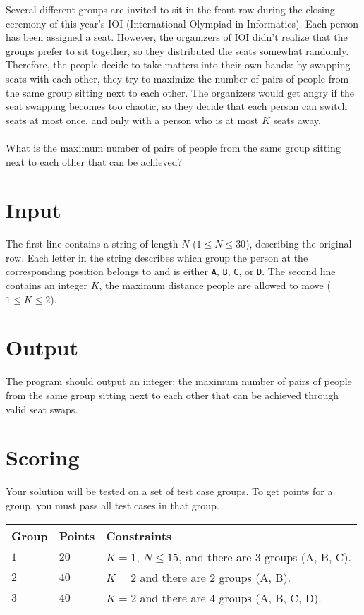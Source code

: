 
Several different groups are invited to sit in the front row during the closing ceremony of this year's IOI (International Olympiad in Informatics). Each person has been assigned a seat. However, the organizers of IOI didn't realize that the groups prefer to sit together, so they distributed the seats somewhat randomly. Therefore, the people decide to take matters into their own hands: by swapping seats with each other, they try to maximize the number of pairs of people from the same group sitting next to each other. The organizers would get angry if the seat swapping becomes too chaotic, so they decide that each person can switch seats at most once, and only with a person who is at most $K$ seats away. \\ \\
What is the maximum number of pairs of people from the same group sitting next to each other that can be achieved?

\section*{Input}
The first line contains a string of length $N$ ($1 \leq N \leq 30$), describing the original row. Each letter in the string describes which group the person at the corresponding position belongs to and is either \texttt{A}, \texttt{B}, \texttt{C}, or \texttt{D}. The second line contains an integer $K$, the maximum distance people are allowed to move ($1 \leq K \leq 2$).

\section*{Output}
The program should output an integer: the maximum number of pairs of people from the same group sitting next to each other that can be achieved through valid seat swaps.

\section*{Scoring}
Your solution will be tested on a set of test case groups. To get points for a group, you must pass all test cases in that group.

\noindent
\begin{tabular}{| l | l | p{12cm} |}
  \hline
  \textbf{Group} & \textbf{Points} & \textbf{Constraints} \\ \hline
  $1$    & $20$       & $K=1$, $N \leq 15$, and there are 3 groups (A, B, C). \\ \hline
  $2$    & $40$       & $K=2$ and there are 2 groups (A, B). \\ \hline
  $3$    & $40$       & $K=2$ and there are 4 groups (A, B, C, D). \\ \hline
\end{tabular}


